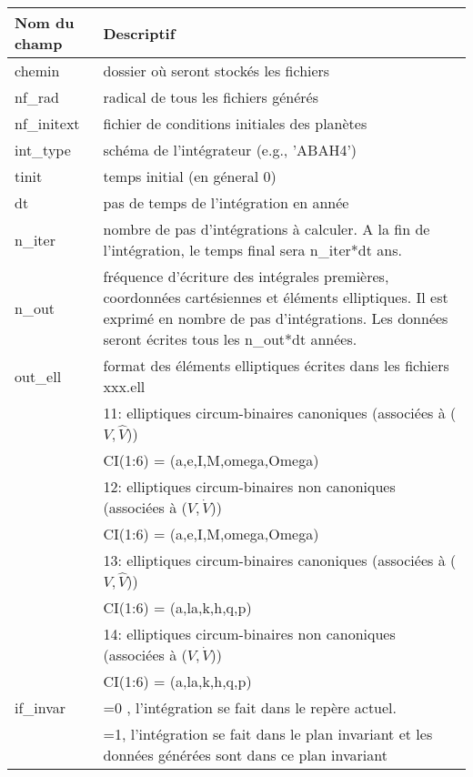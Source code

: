 \documentclass[11pt]{article}
\begin{document}
\begin{tabularx}{\textwidth}{|l|X|}
\hline
Nom du champ& Descriptif \\ \hline 
chemin   & dossier o\`u seront stock\'es les fichiers \\ \hline
 nf\_rad    & radical de tous les fichiers g\'en\'er\'es\\ \hline
 nf\_initext& fichier de conditions initiales des plan\`etes\\ \hline

 int\_type& sch\'ema de l'int\'egrateur (e.g., 'ABAH4') \\ \hline

 
 tinit & temps initial (en g\'eneral 0) \\ \hline

 dt& pas de temps de l'int\'egration en ann\'ee \\ \hline

 n\_iter& nombre de pas d'int\'egrations \`a calculer. A la fin de l'int\'egration, le temps final sera  n\_iter*dt ans.\\ \hline

 n\_out & fr\'equence d'\'ecriture des int\'egrales premi\`eres, coordonn\'ees cart\'esiennes et \'el\'ements elliptiques. Il est exprim\'e en nombre de pas d'int\'egrations. Les donn\'ees seront \'ecrites tous les n\_out*dt ann\'ees.
 \\ \hline
 out\_ell & format des \'el\'ements elliptiques \'ecrites dans les fichiers xxx.ell \\
&11:  elliptiques circum-binaires canoniques (associ\'ees \`a ($V,\hat{V}$))\\
&	     CI(1:6) = (a,e,I,M,omega,Omega)\\
&12:  elliptiques circum-binaires non canoniques (associ\'ees \`a ($V,\dot{V}$))\\
&	     CI(1:6) = (a,e,I,M,omega,Omega)\\
&13:  elliptiques circum-binaires canoniques (associ\'ees \`a ($V,\hat{V}$))\\
&	     CI(1:6) = (a,la,k,h,q,p)\\
&14:  elliptiques circum-binaires non canoniques (associ\'ees \`a ($V,\dot{V}$))\\
&	     CI(1:6) = (a,la,k,h,q,p)\\
 \hline
 if\_invar & =0 , l'int\'egration se fait dans le rep\`ere actuel. \\
& =1, l'int\'egration se fait dans le plan invariant et les donn\'ees g\'en\'er\'ees sont dans ce plan invariant 
\\ \hline


\end{tabularx}
\end{document}
